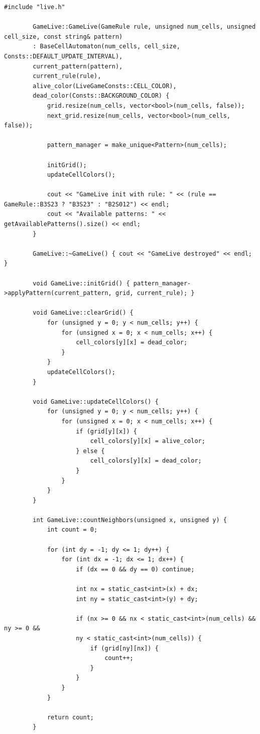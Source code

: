 \documentclass[14pt,a4paper]{extarticle}
\theoremstyle{plain}
\begin{document}
	
	\begin{lstlisting}[title=live.cpp, gobble=16, breaklines=true, showspaces=false, showtabs=false, breakatwhitespace=true]
		#include "live.h"
		
		GameLive::GameLive(GameRule rule, unsigned num_cells, unsigned cell_size, const string& pattern)
		: BaseCellAutomaton(num_cells, cell_size, Consts::DEFAULT_UPDATE_INTERVAL),
		current_pattern(pattern),
		current_rule(rule),
		alive_color(LiveGameConsts::CELL_COLOR),
		dead_color(Consts::BACKGROUND_COLOR) {
			grid.resize(num_cells, vector<bool>(num_cells, false));
			next_grid.resize(num_cells, vector<bool>(num_cells, false));
			
			pattern_manager = make_unique<Pattern>(num_cells);
			
			initGrid();
			updateCellColors();
			
			cout << "GameLive init with rule: " << (rule == GameRule::B3S23 ? "B3S23" : "B2S012") << endl;
			cout << "Available patterns: " << getAvailablePatterns().size() << endl;
		}
		
		GameLive::~GameLive() { cout << "GameLive destroyed" << endl; }
		
		void GameLive::initGrid() { pattern_manager->applyPattern(current_pattern, grid, current_rule); }
		
		void GameLive::clearGrid() {
			for (unsigned y = 0; y < num_cells; y++) {
				for (unsigned x = 0; x < num_cells; x++) {
					cell_colors[y][x] = dead_color;
				}
			}
			updateCellColors();
		}
		
		void GameLive::updateCellColors() {
			for (unsigned y = 0; y < num_cells; y++) {
				for (unsigned x = 0; x < num_cells; x++) {
					if (grid[y][x]) {
						cell_colors[y][x] = alive_color;
					} else {
						cell_colors[y][x] = dead_color;
					}
				}
			}
		}
		
		int GameLive::countNeighbors(unsigned x, unsigned y) {
			int count = 0;
			
			for (int dy = -1; dy <= 1; dy++) {
				for (int dx = -1; dx <= 1; dx++) {
					if (dx == 0 && dy == 0) continue;
					
					int nx = static_cast<int>(x) + dx;
					int ny = static_cast<int>(y) + dy;
					
					if (nx >= 0 && nx < static_cast<int>(num_cells) && ny >= 0 &&
					ny < static_cast<int>(num_cells)) {
						if (grid[ny][nx]) {
							count++;
						}
					}
				}
			}
			
			return count;
		}
		

\end{lstlisting}
\end{document}
